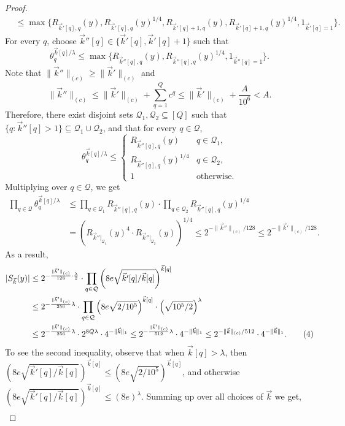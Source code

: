\begin{proof}
\begin{align*}
&\le\max\{R_{\vec k'[q],q}(y),R_{\vec k'[q],q}(y)^{1/4},R_{\vec k'[q]+1,q}(y),R_{\vec k'[q]+1,q}(y)^{1/4},1_{\vec k'[q]=1}\}.
\end{align*}
For every $q$, choose $\vec k''[q]\in\{\vec k'[q],\vec k'[q]+1\}$ such that
\[
\theta_q^{\vec k[q]/\lambda}\le\max\{R_{\vec k''[q],q}(y),R_{\vec k''[q],q}(y)^{1/4},1_{\vec k''[q]=1}\}.
\]
Note that $\|\vec k''\|_{(c)}\ge\|\vec k'\|_{(c)}$ and
\[
\|\vec k''\|_{(c)}\le\|\vec k'\|_{(c)}+\sum_{q=1}^Qc^q\le\|\vec k'\|_{(c)}+\frac A{10^6}<A.
\]
Therefore, there exist disjoint sets $\mathcal Q_1,\mathcal Q_2\subseteq[Q]$ such that $\{q:\vec k''[q]>1\}\subseteq\mathcal Q_1\cup\mathcal Q_2$, and that for every $q\in\mathcal Q$,
\[
\theta_q^{\vec k[q]/\lambda}\le
\begin{cases}R_{\vec k''[q],q}(y)&q\in\mathcal Q_1,\\R_{\vec k''[q],q}(y)^{1/4}&q\in\mathcal Q_2,\\1&\text{otherwise}.\end{cases}
\]
Multiplying over $q\in\mathcal Q$, we get
\begin{align*}
\prod_{q\in\mathcal Q}\theta_q^{\vec k[q]/\lambda}
&\le\prod_{q\in\mathcal Q_1}R_{\vec k''[q],q}(y)\cdot\prod_{q\in\mathcal Q_2}R_{\vec k''[q],q}(y)^{1/4}\\
&=\left(R_{\vec k''|_{\mathcal Q_1}}(y)^4\cdot R_{\vec k''|_{\mathcal Q_2}}(y)\right)^{1/4}
\le2^{-\|\vec k''\|_{(c)}/128}\le2^{-\|\vec k'\|_{(c)}/128}.
\end{align*}
As a result,
\begin{align}
|S_{\vec k}(y)|
&\le2^{-\frac{\|\vec k'\|_{(c)}}{128}\cdot\frac\lambda2}
\cdot\prod_{q\in\mathcal Q}\left(8e\sqrt{\vec k'[q]/\vec k[q]}\right)^{\vec k[q]}\notag\\
&\le2^{-\frac{\|\vec k'\|_{(c)}}{256}\lambda}\cdot
\prod_{q\in\mathcal Q}\left(8e\sqrt{2/10^5}\right)^{\vec k[q]}\cdot\left(\sqrt{10^5/2}\right)^\lambda\notag\\
&\le2^{-\frac{\|\vec k'\|_{(c)}}{256}\lambda}\cdot2^{8Q\lambda}\cdot4^{-\|\vec k\|_1}
\le2^{-\frac{\|\vec k'\|_{(c)}}{512}\lambda}\cdot4^{-\|\vec k\|_1}
\le2^{-\|\vec k\|_{(c)}/512}\cdot4^{-\|\vec k\|_1}.\tag{4}
\end{align}
To see the second inequality, observe that when $\vec k[q]>\lambda$, then
$\left(8e\sqrt{\vec k'[q]/\vec k[q]}\right)^{\vec k[q]}
\le(8e\sqrt{2/10^5})^{\vec k[q]}$, and otherwise
$\left(8e\sqrt{\vec k'[q]/\vec k[q]}\right)^{\vec k[q]}\le(8e)^\lambda$.
Summing up over all choices of $\vec k$ we get,
\begin{align*}

\end{align*}
\end{proof}
